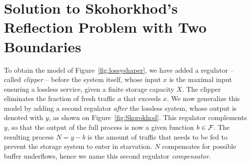 \section[Skohorkhod's Reflection Problem]{Solution to Skohorkhod's Reflection Problem with Two Boundaries}

To obtain the model  of Figure~\ref{fig:lossyshaper}, we have
added a regulator -- called {\em clipper} --  before the system
itself, whose input $x$ is the maximal input ensuring a lossless
service, given a finite storage capacity $X$. The clipper
eliminates the fraction of fresh traffic $a$ that exceeds $x$. We
now generalize this model by adding a second regulator
\emph{after} the lossless system, whose output is denoted with
$y$, as shown on Figure~\ref{fig:Skorokhod}. This regulator
complements $y$, so that the output of the full process is now a
given function $b \in \mathcal F$. The resulting process $N = y - b$ is
the amount of traffic that needs to be fed to prevent the storage
system to enter in starvation. $N$ compensates for possible buffer
underflows, hence we name this second regulator {\em compensator}.

\begin{figure}[!h]
    \protect{}
\end{figure}

